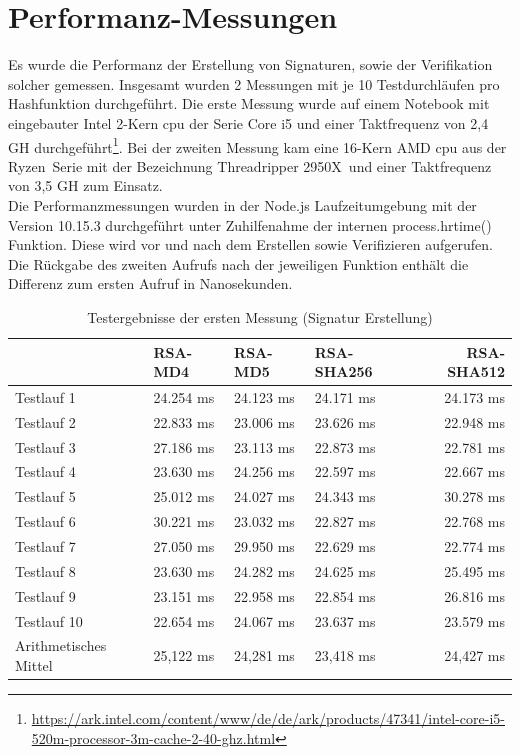 \section{Performanz-Messungen}
Es wurde die Performanz der Erstellung von Signaturen, sowie der Verifikation solcher gemessen. Insgesamt wurden 2 Messungen mit je 10 Testdurchläufen pro Hashfunktion durchgeführt. Die erste Messung wurde auf einem Notebook mit eingebauter Intel 2-Kern \gls{cpu} der Serie Core i5 und einer Taktfrequenz von 2,4 GH durchgeführt\footnote{\url{https://ark.intel.com/content/www/de/de/ark/products/47341/intel-core-i5-520m-processor-3m-cache-2-40-ghz.html}}. Bei der zweiten Messung kam eine 16-Kern AMD \gls{cpu} aus der \glqq Ryzen\grqq~Serie mit der Bezeichnung \glqq Threadripper 2950X\grqq~und einer Taktfrequenz von 3,5 GH zum Einsatz.\\
Die Performanzmessungen wurden in der Node.js Laufzeitumgebung mit der Version 10.15.3 durchgeführt unter Zuhilfenahme der internen process.hrtime() Funktion. Diese wird vor und nach dem Erstellen sowie Verifizieren aufgerufen. Die Rückgabe des zweiten Aufrufs nach der jeweiligen Funktion enthält die Differenz zum ersten Aufruf in Nanosekunden.
\begin{table}[h]
	\begin{tabularx}{\textwidth}{p{}|X|X|X|r}
		& RSA-MD4 & RSA-MD5 & RSA-SHA256 & RSA-SHA512\\
		\hline
		Testlauf 1& 24.254 ms& 24.123 ms& 24.171 ms& 24.173 ms\\
		Testlauf 2& 22.833 ms& 23.006 ms& 23.626 ms& 22.948 ms\\
		Testlauf 3& 27.186 ms& 23.113 ms& 22.873 ms& 22.781 ms\\
		Testlauf 4& 23.630 ms& 24.256 ms& 22.597 ms& 22.667 ms\\
		Testlauf 5& 25.012 ms& 24.027 ms& 24.343 ms& 30.278 ms\\
		Testlauf 6& 30.221 ms& 23.032 ms& 22.827 ms& 22.768 ms\\
		Testlauf 7& 27.050 ms& 29.950 ms& 22.629 ms& 22.774 ms\\
		Testlauf 8& 23.630 ms& 24.282 ms& 24.625 ms& 25.495 ms\\
		Testlauf 9& 23.151 ms& 22.958 ms& 22.854 ms& 26.816 ms\\
		Testlauf 10& 22.654 ms& 24.067 ms& 23.637 ms& 23.579 ms\\
		\hline
		Arithmetisches Mittel& 25,122 ms& 24,281 ms& 23,418 ms& 24,427 ms\\
	\end{tabularx}
	\caption{Testergebnisse der ersten Messung (Signatur Erstellung)}
\end{table}
